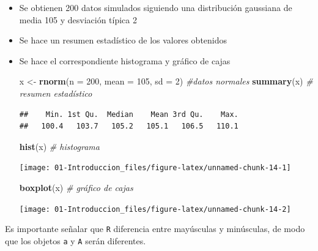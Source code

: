 \documentclass[]{book}
\newenvironment{Shaded}{\begin{snugshade}}{\end{snugshade}}
\newcommand{\KeywordTok}[1]{\textcolor[rgb]{0.13,0.29,0.53}{\textbf{#1}}}
\newcommand{\DataTypeTok}[1]{\textcolor[rgb]{0.13,0.29,0.53}{#1}}
\newcommand{\DecValTok}[1]{\textcolor[rgb]{0.00,0.00,0.81}{#1}}
\newcommand{\StringTok}[1]{\textcolor[rgb]{0.31,0.60,0.02}{#1}}
\newcommand{\CommentTok}[1]{\textcolor[rgb]{0.56,0.35,0.01}{\textit{#1}}}
\newcommand{\NormalTok}[1]{#1}
\begin{document}
\begin{itemize}
\item
  Se obtienen 200 datos simulados siguiendo una distribución gaussiana
  de media 105 y desviación típica 2
\item
  Se hace un resumen estadístico de los valores obtenidos
\item
  Se hace el correspondiente histograma y gráfico de cajas

\begin{Shaded}
\begin{Highlighting}[]
\NormalTok{x <-}\StringTok{ }\KeywordTok{rnorm}\NormalTok{(}\DataTypeTok{n =} \DecValTok{200}\NormalTok{, }\DataTypeTok{mean =} \DecValTok{105}\NormalTok{, }\DataTypeTok{sd =} \DecValTok{2}\NormalTok{) }\CommentTok{#datos normales}
\KeywordTok{summary}\NormalTok{(x) }\CommentTok{# resumen estadístico}
\end{Highlighting}
\end{Shaded}

\begin{verbatim}
##    Min. 1st Qu.  Median    Mean 3rd Qu.    Max. 
##   100.4   103.7   105.2   105.1   106.5   110.1
\end{verbatim}

\begin{Shaded}
\begin{Highlighting}[]
\KeywordTok{hist}\NormalTok{(x) }\CommentTok{# histograma}
\end{Highlighting}
\end{Shaded}

  \begin{center}\texttt{[image: 01-Introduccion\_files/figure-latex/unnamed-chunk-14-1]} \end{center}

\begin{Shaded}
\begin{Highlighting}[]
\KeywordTok{boxplot}\NormalTok{(x) }\CommentTok{# gráfico de cajas}
\end{Highlighting}
\end{Shaded}

  \begin{center}\texttt{[image: 01-Introduccion\_files/figure-latex/unnamed-chunk-14-2]} \end{center}
\end{itemize}

Es importante señalar que \texttt{R} diferencia entre mayúsculas y
minúsculas, de modo que los objetos \texttt{a} y \texttt{A} serán
diferentes.
\end{document}
